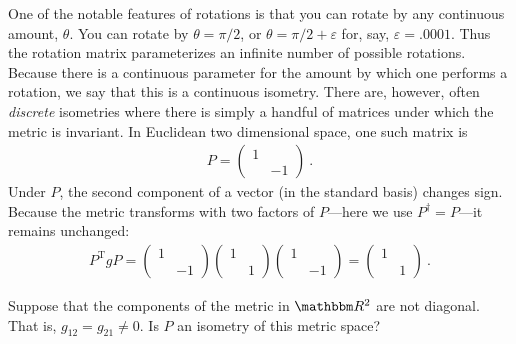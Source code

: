 \documentclass[12pt, oneside]{report}    %
\begin{document}
\begin{subappendices}
One of the notable features of rotations is that you can rotate by any continuous amount, $\theta$. You can rotate by $\theta=\pi/2$, or $\theta = \pi/2 + \varepsilon$ for, say, $\varepsilon = .0001$. Thus the rotation matrix parameterizes an infinite number of possible rotations. Because there is a continuous parameter for the amount by which one performs a rotation, we say that this is a continuous isometry. There are, however, often \emph{discrete} isometries where there is simply a handful of matrices under which the metric is invariant. In Euclidean two dimensional space, one such matrix is 
\begin{align}
    P = \begin{pmatrix}
        1 & \\
        & -1 
    \end{pmatrix} \ .
\end{align}
Under $P$, the second component of a vector (in the standard basis) changes sign. Because the metric transforms with two factors of $P$---here we use $P^\dag = P$---it remains unchanged:
\begin{align}
    P^\text{T}gP = 
    \begin{pmatrix}
        1 & \\ 
        & -1 
    \end{pmatrix}
    \begin{pmatrix}
        1 & \\ 
        & 1 
    \end{pmatrix}
    \begin{pmatrix}
        1 & \\ 
        & -1 
    \end{pmatrix}
    = 
    \begin{pmatrix}
        1 & \\ 
        & 1 
    \end{pmatrix} \ .
\end{align}
\begin{exercise}
Suppose that the components of the metric in $\RR^2$ are not diagonal. That is, $g_{12} = g_{21}\neq 0$. Is $P$ an isometry of this metric space?
\end{exercise}


\end{subappendices}
\end{document}
